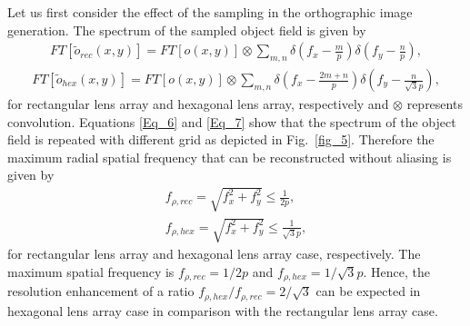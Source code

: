 \documentclass[10pt,letterpaper]{article}
\begin{document}
Let us first consider the effect of the sampling in the orthographic image generation. The spectrum of the sampled object field is given by
\begin{align} 
FT\left[\tilde{o}_{rec} \left(x,y\right)\right]=FT[o(x,y)]\otimes \sum _{m,n}\delta \left(f_x -\frac{m}{p} \right)\delta \left(f_{y} -\frac{n}{p} \right),  
\label{Eq_6}
\end{align} 
\begin{align} 
FT\left[\tilde{o}_{hex} \left(x,y\right)\right]=FT[o(x,y)]\otimes \sum _{m,n}\delta \left(f_x -\frac{2m+n}{p} \right)\delta \left(f_{y} -\frac{n}{\sqrt{3} p} \right), 
\label{Eq_7} 
\end{align} 
for rectangular lens array and hexagonal lens array, respectively and $\otimes$ represents convolution. Equations \eqref{Eq_6} and \eqref{Eq_7} show that the spectrum of the object field is repeated with different grid as depicted in Fig.~\ref{fig_5}. Therefore the maximum radial spatial frequency that can be reconstructed without aliasing is given by
\begin{align}  
f_{\rho,rec} =\sqrt{f_x^2 +f_y^2} \le \frac{1}{2p}, \nonumber \\ 
f_{\rho ,hex} =\sqrt{f_x^2 +f_y^2} \le \frac{1}{\sqrt{3} p} ,
\label{Eq_8}
\end{align} 
for rectangular lens array and hexagonal lens array case, respectively. The maximum spatial frequency is $f_{\rho,rec}=1/2p$ and $f_{\rho,hex}=1/\sqrt{3}p$. Hence, the resolution enhancement of a ratio $f_{\rho,hex}/f_{\rho,rec}=2/\sqrt{3}$ can be expected in hexagonal lens array case in comparison with the rectangular lens array case.
\end{document}
